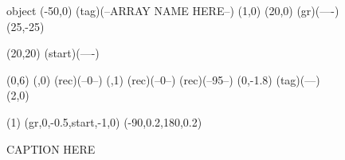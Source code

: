 \documentclass{article}
\begin{document}
\newcommand{\ArrayName}
{ARRAY NAME HERE}
\newcommand{\Caption}
{CAPTION HERE}
\newcommand{\ArrayLengthMinusOne}
{6}
\newcommand{\0}
{0}
\newcommand{\1}
{0}
\newcommand{\2}
{95}
\newcommand{\3}
{0}
\newcommand{\4}
{0}
\newcommand{\5}
{0}
\newcommand{\6}
{0}
\newcommand{\7}
{0}
\newcommand{\8}
{0}
\newcommand{\9}
{0}
\newcommand{\ten}
{0}
\newcommand{\eleven}
{0}

\begin {figure}

\Draw

 {object}
\Move(-50,0)
\Node(tag)(--\ArrayName--)
\MoveToExit(1,0)
\Move(20,0)
\ORectNode(gr)(----)
\Move (25,-25)

\MinNodeSize(20,20)
\Node(start)(----)

\Do(0,\ArrayLengthMinusOne)
{  
	\IF 
    	\EqInt(\value{Counter},0) 				
        	\THEN
 				\RectNode(rec)(--\0--)
   \ELSE
   		\IF
        \EqInt(\value{Counter},1) 				
        	\THEN
 				\RectNode(rec)(--\1--)
                \ELSE
   		\RectNode(rec)(--\2--)
   \FI
   { 	\MoveToExit(0,-1.8)
 	\Node(tag)(--\DoReg--)
   }
   \MoveToExit(2,0)
}

\ArrowHeads(1)
\CurvedEdgeAt(gr,0,-0.5,start,-1,0) (-90,0.2,180,0.2)
\EndDraw

\caption {\Caption}

\label {fig:array}

\end {figure}
\end{document}
